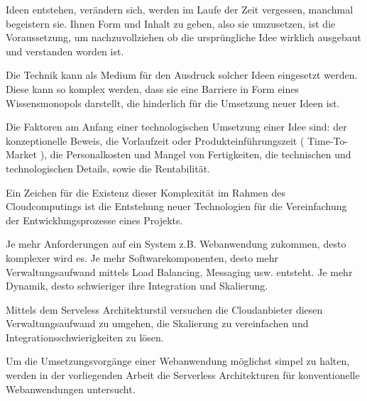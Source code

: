 \documentclass[
12pt,
english,
ngerman,
headsepline,
twoside,
openright,
numbers=noenddot,version=first
]{scrreprt}
\begin{document}
Ideen entstehen, verändern sich, werden im Laufe der Zeit vergessen, manchmal begeistern sie. Ihnen Form und Inhalt zu geben, also sie umzusetzen, ist die Voraussetzung, um nachzuvollziehen ob die ursprüngliche Idee wirklich ausgebaut und verstanden worden ist.

Die Technik kann als Medium für den Ausdruck solcher Ideen eingesetzt werden. Diese kann so komplex werden, dass sie eine Barriere in Form eines Wissensmonopols darstellt, die hinderlich für die Umsetzung neuer Ideen ist.


Die Faktoren am Anfang einer technologischen Umsetzung einer Idee sind:\label{aspect}
der konzeptionelle Beweis, die Vorlaufzeit oder Produkteinführungszeit ( Time-To-Market ), die Personalkosten und Mangel von Fertigkeiten, die technischen und technologischen Details, sowie die Rentabilität.



Ein Zeichen für die Existenz dieser Komplexität im Rahmen des Cloudcomputings ist die Entstehung neuer Technologien für die Vereinfachung der Entwicklungsprozesse eines Projekts. 

Je mehr Anforderungen auf ein System z.B. Webanwendung zukommen, desto komplexer wird es. Je mehr Softwarekomponenten, desto mehr Verwaltungsaufwand mittels Load Balancing, Messaging usw. entsteht. Je mehr Dynamik, desto schwieriger ihre Integration und Skalierung.\cite{patternIntegrationEnterprise} 

Mittels dem Serveless Architekturstil versuchen die Cloudanbieter diesen Verwaltungsaufwand zu umgehen, die Skalierung zu vereinfachen und Integrationsschwierigkeiten zu lösen.


Um die Umsetzungsvorgänge einer Webanwendung möglichst simpel zu halten, werden in der vorliegenden Arbeit die Serverless Architekturen für konventionelle Webanwendungen untersucht.
\end{document}
